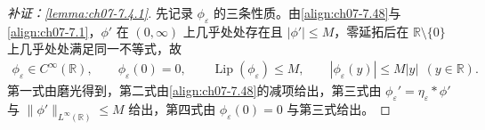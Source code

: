 ﻿\documentclass[../../main.tex]{subfiles}%
\begin{document}
\begin{proof}[补证：\cref{lemma:ch07-7.4.1}]
先记录 $\phi_\varepsilon$ 的三条性质。由\eqref{align:ch07-7.48}与\eqref{align:ch07-7.1}，$\phi'$ 在 $(0,\infty)$ 上几乎处处存在且 $|\phi'|\leqslant M$，零延拓后在 $\mathbb{R}\setminus\{0\}$ 上几乎处处满足同一不等式，故
\begin{align*}
\phi_\varepsilon\in C^\infty(\mathbb{R}),\qquad
\phi_\varepsilon(0)=0,\qquad
\operatorname{Lip}(\phi_\varepsilon)\leqslant M,\qquad
|\phi_\varepsilon(y)|\leqslant M|y|\ \ (y\in\mathbb{R}).
\end{align*}
第一式由磨光得到，第二式由\eqref{align:ch07-7.48}的减项给出，第三式由 $\phi_\varepsilon'=\eta_\varepsilon*\phi'$ 与 $\|\phi'\|_{L^\infty(\mathbb{R})}\leqslant M$ 给出，第四式由 $\phi_\varepsilon(0)=0$ 与第三式给出。


\end{proof}
\end{document}
